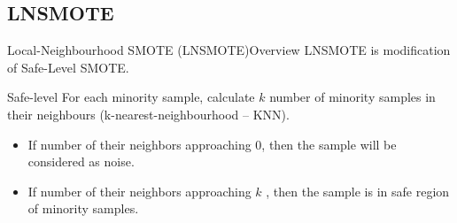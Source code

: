 \documentclass{beamer}
\begin{document}
\subsection{LNSMOTE}

\begin{frame}{Local-Neighbourhood SMOTE (LNSMOTE)}{Overview}
	LNSMOTE is modification of Safe-Level SMOTE.
	\begin{block}{Safe-level}
		For each minority sample, calculate $k$ number of minority samples in
		their neighbours (k-nearest-neighbourhood -- KNN).

		\begin{itemize}
		\item If number of their neighbors approaching 0, then the sample will
		be considered as noise.
		\item If number of their neighbors approaching $k$ , then the sample is
		in safe region of minority samples.
		\end{itemize}
	\end{block}
\end{frame}
\end{document}

